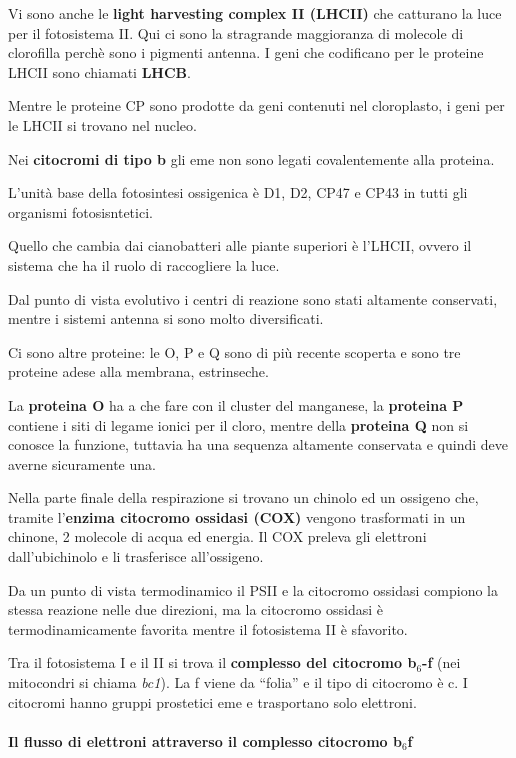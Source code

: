 \documentclass[]{article}
\begin{document}
Vi sono anche le \textbf{light harvesting complex II (LHCII)} che
catturano la luce per il fotosistema II. Qui ci sono la stragrande
maggioranza di molecole di clorofilla perchè sono i pigmenti antenna. I
geni che codificano per le proteine LHCII sono chiamati \textbf{LHCB}.

Mentre le proteine CP sono prodotte da geni contenuti nel cloroplasto, i
geni per le LHCII si trovano nel nucleo.

Nei \textbf{citocromi di tipo b} gli eme non sono legati covalentemente
alla proteina.

L'unità base della fotosintesi ossigenica è D1, D2, CP47 e CP43 in tutti
gli organismi fotosisntetici.

Quello che cambia dai cianobatteri alle piante superiori è l'LHCII,
ovvero il sistema che ha il ruolo di raccogliere la luce.

Dal punto di vista evolutivo i centri di reazione sono stati altamente
conservati, mentre i sistemi antenna si sono molto diversificati.

Ci sono altre proteine: le O, P e Q sono di più recente scoperta e sono
tre proteine adese alla membrana, estrinseche.

La \textbf{proteina O} ha a che fare con il cluster del manganese, la
\textbf{proteina P} contiene i siti di legame ionici per il cloro,
mentre della \textbf{proteina Q} non si conosce la funzione, tuttavia ha
una sequenza altamente conservata e quindi deve averne sicuramente una.

Nella parte finale della respirazione si trovano un chinolo ed un
ossigeno che, tramite l'\textbf{enzima citocromo ossidasi (COX)} vengono
trasformati in un chinone, 2 molecole di acqua ed energia. Il COX
preleva gli elettroni dall'ubichinolo e li trasferisce all'ossigeno.

Da un punto di vista termodinamico il PSII e la citocromo ossidasi
compiono la stessa reazione nelle due direzioni, ma la citocromo
ossidasi è termodinamicamente favorita mentre il fotosistema II è
sfavorito.

Tra il fotosistema I e il II si trova il \textbf{complesso del citocromo
b$_6$-f} (nei mitocondri si chiama \emph{bc1}). La f viene da ``folia''
e il tipo di citocromo è c. I citocromi hanno gruppi prostetici eme e
trasportano solo elettroni.

\paragraph{Il flusso di elettroni attraverso il complesso citocromo
b$_6$f}\label{il-flusso-di-elettroni-attraverso-il-complesso-citocromo-bux5f6f}
\end{document}

